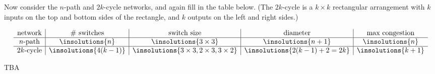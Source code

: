 \begin{problem}
\iffalse

\ppart Now consider the $n$-path and $2k$-cycle networks, and again fill in the
table below. (The $2k$-cycle is a $k \times k$ rectangular arrangement
with $k$ inputs on the top and bottom sides of the rectangle, and $k$
outputs on the left and right sides.)


{\large
\[
\begin{array}{c|c|c|c|c}
\text{network} &
\text{\# switches} &
\text{switch size} &
\text{diameter} &
\text{max congestion} \\ \hline
\text{$n$-path} &
\insolutions{n} &
\insolutions{3 \times 3} &
\insolutions{n+1} &
\insolutions{n} \\ \hline
\text{$2k$-cycle} &
\insolutions{4(k-1)} &
\insolutions{ 3 \times 3, 2\times 3, 3 \times 2 } &
\insolutions{2(k-1)+2 = 2k} &
\insolutions{k+1}
\end{array}
\]
}

\begin{solution}
TBA

\begin{figure}[h]
\end{figure}

\end{solution}

\end{problem}


